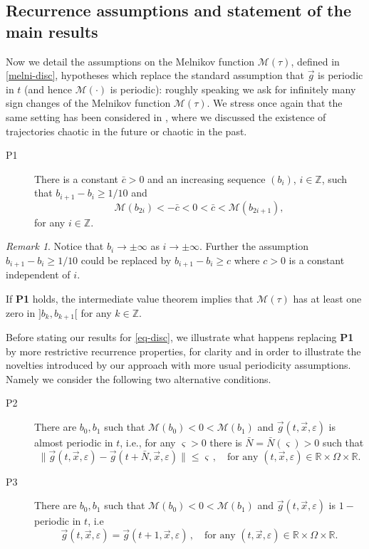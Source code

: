 \documentclass[10pt]{article}
\numberwithin{equation}{section}
\def\ep{\varepsilon}
\def\Om{\Omega}
\def\Z{{\mathbb Z}}
\def\R{{\mathbb R}}
\def\MM{{\mathcal M}}
\def\x{\vec{x}}
\def\g{\vec{g}}
\newcommand\assump[1]{{\rm\textbf{#1}}}
\theoremstyle{definition}
\theoremstyle{remark}
\newtheorem{remark}[theorem]{Remark}
\begin{document}
 \subsection{Recurrence assumptions and statement of the main results} \label{S.results}

 Now we detail the assumptions on the Melnikov function $\MM(\tau)$, defined in \eqref{melni-disc},
hypotheses which replace the standard
assumption that $\g$ is periodic in $t$ (and hence $\MM(\cdot)$ is periodic):  roughly speaking we ask for infinitely many sign changes of the Melnikov function $\MM(\tau)$.
 We stress once again that the same setting has been considered in
\cite{CFPrestate}, where we discussed the existence of trajectories chaotic in the future or chaotic in the past.
 \begin{description}
   \item[P1] There is a constant $\bar{c}>0$ and an increasing sequence $(b_i)$, $i \in \Z$, such that
   $b_{i+1}-b_i \ge 1/10$   and
   $$\MM(b_{2i})<-\bar{c}<0<\bar{c}<\MM(b_{2i+1}),$$
   for any $i \in \Z$.
 \end{description}
\begin{remark}
Notice that $b_i \to \pm \infty$ as $i \to \pm \infty$. Further the assumption $b_{i+1}-b_i \ge  1/10$ could be replaced by
$b_{i+1}-b_i \ge c$ where $c>0$ is a constant independent of $i$.
\end{remark}
If \assump{P1} holds, the intermediate value theorem implies that  $\MM(\tau)$ has at least one zero in $]b_k,b_{k+1}[$ for any $k
\in \Z$.

 Before stating our results for \eqref{eq-disc}, we illustrate what happens  replacing \assump{P1} by more restrictive
recurrence properties,
for clarity and in order to illustrate the novelties introduced by our approach with more usual periodicity
assumptions.
 Namely we consider the following two alternative conditions.

 \begin{description}
   \item[P2] There are  $b_0,b_1$ such that $\MM(b_0)<0<\MM(b_1)$
    and $\g(t,\x,\ep)$ is almost periodic in $t$, i.e., for any  $\varsigma>0$ there is $\bar{N}=\bar{N}(\varsigma)>0$
   such that
   $$ \|\g(t,\x,\ep)- \g(t+\bar{N},\x,\ep)\| \le \varsigma \,, \quad \textrm{for any } (t,\x,\ep) \in\R\times\Om\times\R.$$
     \item[P3]  There are $b_0,b_1$ such that $\MM(b_0)<0<\MM(b_1)$ and $\g(t,\x,\ep)$ is  $1-$periodic in $t$, i.e
   $$ \g(t,\x,\ep)= \g(t+1,\x,\ep)  \, ,\quad \textrm{for any } (t,\x,\ep) \in\R\times\Om\times\R.$$
 \end{description}
\end{document}
